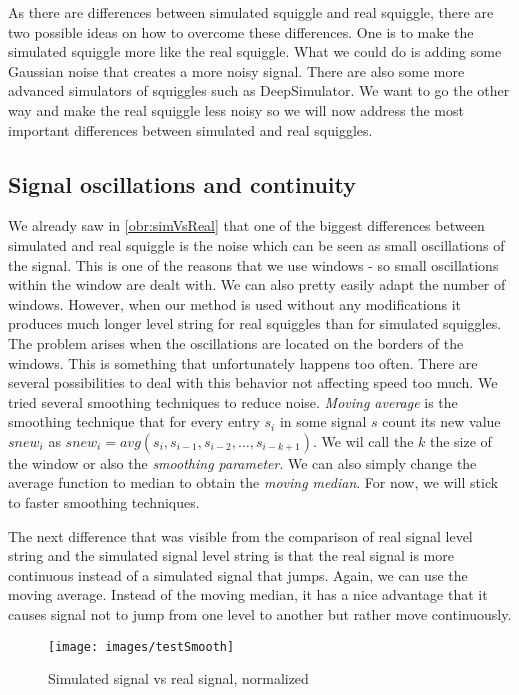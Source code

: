 As there are differences between simulated squiggle and real squiggle, there are two possible
ideas on how to overcome these differences. One is to make the simulated squiggle more like
the real squiggle. What we could do is adding some Gaussian noise that creates a
more noisy signal. There are also some more advanced simulators of squiggles such as
DeepSimulator\cite{deepsimulator}. We want to go the other way and make the real squiggle
less noisy so we will now address the most important differences between simulated and real squiggles.

\subsection{Signal oscillations and continuity}

We already saw in \ref{obr:simVsReal} that one of the biggest differences between simulated and
real squiggle is the noise which can be seen as small oscillations of the signal. This is
one of the reasons that we use windows - so small oscillations within the window
are dealt with. We can also pretty easily adapt the number of windows.
However, when our method is used without any modifications it
produces much longer level string for real squiggles than for simulated squiggles.
The problem arises when the oscillations are located on the borders of the windows.
This is something that unfortunately happens too often. There are several
possibilities to deal with this behavior not affecting speed too
much. We tried several smoothing techniques to reduce noise. \textit{Moving average} is the
smoothing technique that for every entry $s_i$ in some signal $s$ count its new value
$snew_i$ as $snew_i = avg(s_{i}, s_{i-1}, s_{i-2}, \dots , s_{i-k+1})$. We wil call the
$k$ the size of the window or also the \textit{smoothing parameter}. We can also simply change
the average function to median to obtain the \textit{moving median}. For now, we will stick
to faster smoothing techniques.

The next difference that was visible from the comparison of real signal level string
and the simulated signal level string is that the real signal is more continuous instead
of a simulated signal that jumps. Again, we can use the moving average. Instead of
the moving median, it has a nice advantage that it causes signal not to jump from
one level to another but rather move continuously.

\begin{figure}
\centerline{\texttt{[image: images/testSmooth]}}
\caption[Hehe]{Simulated signal vs real signal, normalized}
\label{obr:testSmooth}
\end{figure}

